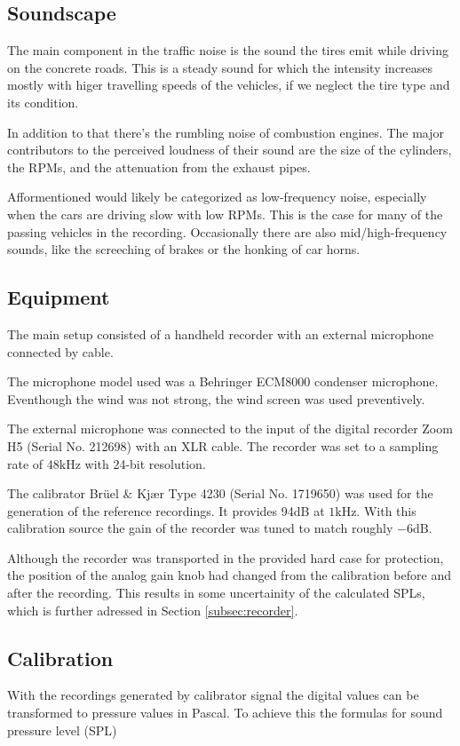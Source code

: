 \documentclass[twocolumn]{article}
\begin{document}
\subsection{Soundscape}
The main component in the traffic noise is the sound the tires emit while driving on the concrete roads.
This is a steady sound for which the intensity increases mostly with higer travelling speeds of the vehicles,
if we neglect the tire type and its condition.

In addition to that there's the rumbling noise of combustion engines.
The major contributors to the perceived loudness of their sound are the size of the cylinders, the RPMs, and
the attenuation from the exhaust pipes.

Afformentioned would likely be categorized as low-frequency noise, especially when the cars are driving slow
with low RPMs.
This is the case for many of the passing vehicles in the recording.
Occasionally there are also mid/high-frequency sounds, like the screeching of brakes or the honking of car horns.

\subsection{Equipment}
The main setup consisted of a handheld recorder with an external microphone connected by cable.

The microphone model used was a Behringer ECM8000 condenser microphone.
Eventhough the wind was not strong, the wind screen was used preventively.

The external microphone was connected to the input of the digital recorder Zoom H5 (Serial No. 212698) with
an XLR cable.
The recorder was set to a sampling rate of $48\textrm{kHz}$ with 24-bit resolution.

The calibrator Brüel \& Kjær Type 4230 (Serial No. 1719650) was used for the generation of the
reference recordings.
It provides 94dB at $1\textrm{kHz}$.
With this calibration source the gain of the recorder was tuned to match roughly $-6\textrm{dB}$.

Although the recorder was transported in the provided hard case for protection, the position of the analog gain
knob had changed from the calibration before and after the recording.
This results in some uncertainity of the calculated SPLs, which is further adressed in Section
\ref{subsec:recorder}.

\subsection{Calibration}
With the recordings generated by calibrator signal the digital values can be transformed to pressure
values in Pascal.
To achieve this the formulas for sound pressure level (SPL)
\end{document}
